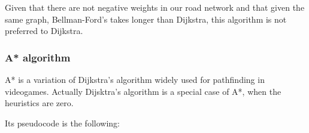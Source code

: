 Given that there are not negative weights in our road network and that given the same graph, Bellman-Ford's takes longer than Dijkstra, this algorithm is not preferred to Dijkstra.

\subsubsection{A* algorithm}

A* is a variation of Dijkstra's algorithm widely used for pathfinding in videogames. Actually Dijsktra's algorithm is a special case of A*, when the heuristics are zero. 


Its pseudocode is the following:

